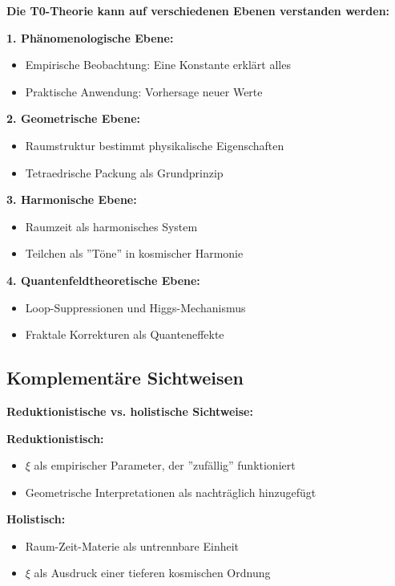 \documentclass[12pt,a4paper]{article}
\newcommand{\xipar}{\xi}
\begin{document}
	\begin{foundation}
		\textbf{Die T0-Theorie kann auf verschiedenen Ebenen verstanden werden:}
		
		\textbf{1. Phänomenologische Ebene:}
		\begin{itemize}
			\item Empirische Beobachtung: Eine Konstante erklärt alles
			\item Praktische Anwendung: Vorhersage neuer Werte
		\end{itemize}
		
		\textbf{2. Geometrische Ebene:}
		\begin{itemize}
			\item Raumstruktur bestimmt physikalische Eigenschaften
			\item Tetraedrische Packung als Grundprinzip
		\end{itemize}
		
		\textbf{3. Harmonische Ebene:}
		\begin{itemize}
			\item Raumzeit als harmonisches System
			\item Teilchen als ''Töne'' in kosmischer Harmonie
		\end{itemize}
		
		\textbf{4. Quantenfeldtheoretische Ebene:}
		\begin{itemize}
			\item Loop-Suppressionen und Higgs-Mechanismus
			\item Fraktale Korrekturen als Quanteneffekte
		\end{itemize}
	\end{foundation}
	
	\subsection{Komplementäre Sichtweisen}
	
	\begin{alternative}
		\textbf{Reduktionistische vs. holistische Sichtweise:}
		
		\textbf{Reduktionistisch:}
		\begin{itemize}
			\item $\xipar$ als empirischer Parameter, der ''zufällig'' funktioniert
			\item Geometrische Interpretationen als nachträglich hinzugefügt
		\end{itemize}
		
		\textbf{Holistisch:}
		\begin{itemize}
			\item Raum-Zeit-Materie als untrennbare Einheit
			\item $\xipar$ als Ausdruck einer tieferen kosmischen Ordnung
		\end{itemize}
	\end{alternative}
	
\end{document}
